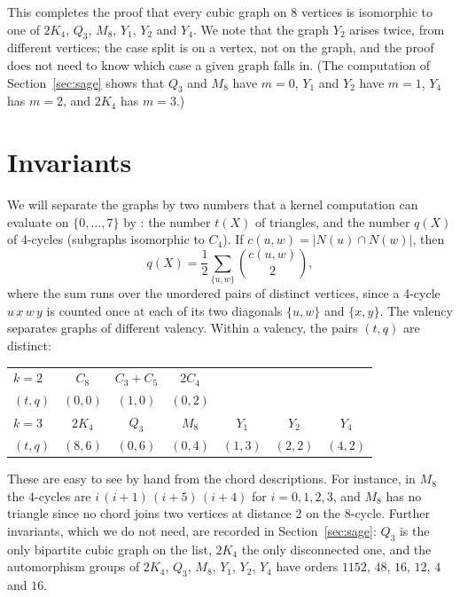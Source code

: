 \documentclass[11pt]{amsart}
\theoremstyle{definition}
\DeclareRobustCommand{\ml}[1]{\ifmmode\text{\normalfont\small\ttfamily\detokenize{#1}}\else{\normalfont\small\nolinkurl{#1}}\fi}
\newcommand{\nb}{N}
\begin{document}
This completes the proof that every cubic graph on 8 vertices is isomorphic to one of $2K_4$,
$Q_3$, $M_8$, $Y_1$, $Y_2$ and $Y_4$. We note that the graph $Y_2$ arises twice, from different
vertices; the case split is on a vertex, not on the graph, and the proof does not need to know
which case a given graph falls in. (The computation of Section~\ref{sec:sage} shows that $Q_3$ and
$M_8$ have $m=0$, $Y_1$ and $Y_2$ have $m=1$, $Y_4$ has $m=2$, and $2K_4$ has $m=3$.)

\section{Invariants}\label{sec:inv}

We will separate the graphs by two numbers that a kernel computation can evaluate on
$\{0,\dots,7\}$ by \ml{decide}: the number $t(X)$ of triangles, and the number $q(X)$ of 4-cycles
(subgraphs isomorphic to $C_4$). If $c(u,w)=\lvert\nb(u)\cap\nb(w)\rvert$, then
\[
q(X)=\frac12\sum_{\{u,w\}}\binom{c(u,w)}{2},
\]
where the sum runs over the unordered pairs of distinct vertices, since a 4-cycle
$u\,x\,w\,y$ is counted once at each of its two diagonals $\{u,w\}$ and $\{x,y\}$. The valency
separates graphs of different valency. Within a valency, the pairs $(t,q)$ are distinct:

\begin{center}
\begin{tabular}{lcccccc}
\toprule
$k=2$ & $C_8$ & $C_3+C_5$ & $2C_4$ \\
$(t,q)$ & $(0,0)$ & $(1,0)$ & $(0,2)$ \\
\midrule
$k=3$ & $2K_4$ & $Q_3$ & $M_8$ & $Y_1$ & $Y_2$ & $Y_4$\\
$(t,q)$ & $(8,6)$ & $(0,6)$ & $(0,4)$ & $(1,3)$ & $(2,2)$ & $(4,2)$\\
\bottomrule
\end{tabular}
\end{center}

These are easy to see by hand from the chord descriptions. For instance, in $M_8$ the 4-cycles are
$i\,(i{+}1)\,(i{+}5)\,(i{+}4)$ for $i=0,1,2,3$, and $M_8$ has no triangle since no chord joins two
vertices at distance 2 on the 8-cycle. Further invariants, which we do not need, are recorded in
Section~\ref{sec:sage}: $Q_3$ is the only bipartite cubic graph on the list, $2K_4$ the only
disconnected one, and the automorphism groups of $2K_4$, $Q_3$, $M_8$, $Y_1$, $Y_2$, $Y_4$ have
orders $1152$, $48$, $16$, $12$, $4$ and $16$.
\end{document}
